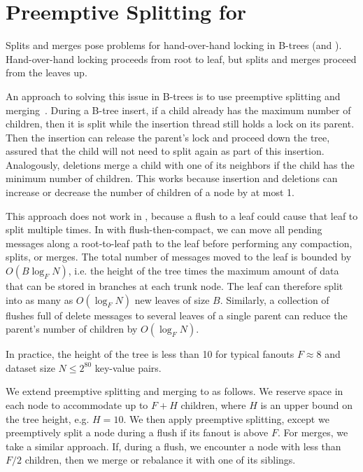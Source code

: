 \section{Preemptive Splitting for \datastructs}
\label{sec:splitting}

Splits and merges pose problems for hand-over-hand locking in B-trees
(and \bets).  Hand-over-hand locking proceeds from root to leaf, but
splits and merges proceed from the leaves up.

An approach to solving this issue in B-trees is to use preemptive splitting and
merging~\cite{DBLP:journals/tos/Rodeh08}.  During a B-tree insert, if a child
already has the maximum number of children, then it is split while the
insertion thread still holds a lock on its parent.  Then the insertion can
release the parent's lock and proceed down the tree, assured that the child
will not need to split again as part of this insertion.  Analogously, deletions
merge a child with one of its neighbors if the child has the minimum number of
children.  This works because insertion and deletions can increase or decrease
the number of children of a node by at most 1.

This approach does not work in \bets, because a flush to a leaf could
cause that leaf to split multiple times.  In \datastruct with
flush-then-compact, we can move all pending messages along a
root-to-leaf path to the leaf before performing any compaction,
splits, or merges.  The total number of messages moved to the leaf is
bounded by $O(B\log_F N)$, i.e. the height of the tree times the
maximum amount of data that can be stored in branches at each trunk
node.  The leaf can therefore split into as many as $O(\log_F
N)$ new leaves of size $B$.  Similarly, a collection of flushes full
of delete messages to several leaves of a single parent can reduce the
parent's number of children by $O(\log_F N)$.

In practice, the height of the tree is less than 10 for typical
fanouts $F\approx 8$ and dataset size $N\leq 2^{80}$ key-value
pairs.

We extend preemptive splitting and merging to \datastructs as follows.
We reserve space in each node to accommodate up to $F + H$
children, where $H$ is an upper bound on the tree height, e.g. $H=10$.
We then apply preemptive splitting, except we preemptively split a
node during a flush if its fanout is above $F$.  For merges, we
take a similar approach.  If, during a flush, we encounter a node with
less than $F/2$ children, then we merge or rebalance it with one
of its siblings.

